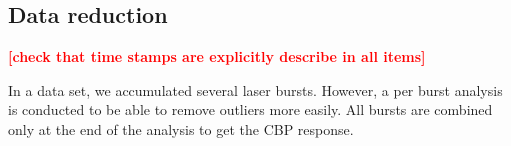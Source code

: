 \documentclass[printer]{aa}
\newcommand{\todo}[1]{\textbf{\textcolor{red}{[#1]}}\xspace}
\begin{document}


%
%
%
%
%
%


%
%



\subsection{Data reduction}

\todo{check that time stamps are explicitly describe in all items}

In a data set, we accumulated several laser bursts. However, a per burst analysis is conducted to be able to remove outliers more easily. All bursts are combined only at the end of the analysis to get the CBP response.
\end{document}
